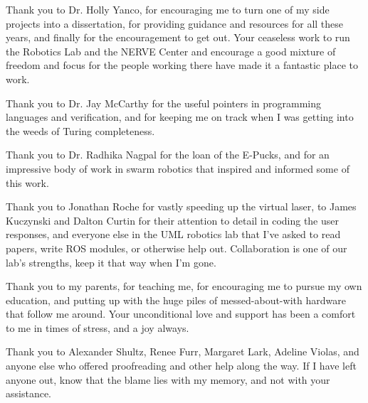 Thank you to Dr. Holly Yanco, for encouraging me to turn one of my side projects into a dissertation, for providing guidance and resources for all these years, and finally for the encouragement to get out. Your ceaseless work to run the Robotics Lab and the NERVE Center and encourage a good mixture of freedom and focus for the people working there have made it a fantastic place to work. 

Thank you to Dr. Jay McCarthy for the useful pointers in programming languages and verification, and for keeping me on track when I was getting into the weeds of Turing completeness. 

Thank you to Dr. Radhika Nagpal for the loan of the E-Pucks, and for an impressive body of work in swarm robotics that inspired and informed some of this work. 

Thank you to Jonathan Roche for vastly speeding up the virtual laser, to James Kuczynski and Dalton Curtin for their attention to detail in coding the user responses, and everyone else in the UML robotics lab that I've asked to read papers, write ROS modules, or otherwise help out. Collaboration is one of our lab's strengths, keep it that way when I'm gone.  

Thank you to my parents, for teaching me, for encouraging me to pursue my own education, and putting up with the huge piles of messed-about-with hardware that follow me around. Your unconditional love and support has been a comfort to me in times of stress, and a joy always.

Thank you to Alexander Shultz, Renee Furr, Margaret Lark, Adeline Violas, and anyone else who offered proofreading and other help along the way. If I have left anyone out, know that the blame lies with my memory, and not with your assistance. 

